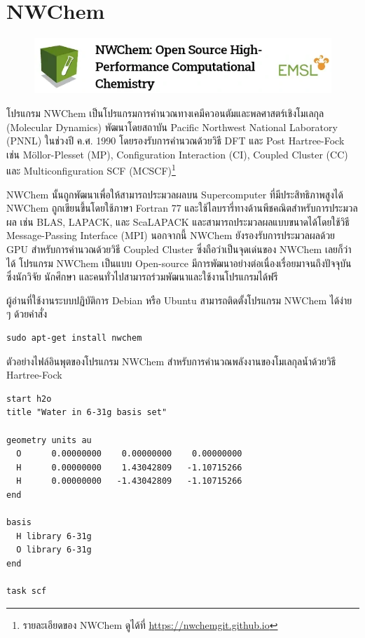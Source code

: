 \section{NWChem}
\label{sec:software_nwchem}

\begin{figure}[H]
    \centering
    \includegraphics[width=0.7\linewidth]{fig/logo_nwchem.png}
    \label{fig:logo_nwchem}
\end{figure}

โปรแกรม NWChem เป็นโปรแกรมการคำนวณทางเคมีควอนตัมและพลศาสตร์เชิงโมเลกุล (Molecular Dynamics)\autocite{apra2020} 
พัฒนาโดยสถาบัน Pacific Northwest National Laboratory (PNNL) ในช่วงปี ค.ศ. 1990 โดยรองรับการคำนวณด้วยวิธี DFT และ Post Hartree-Fock เช่น M\"{o}llor-Plesset (MP), Configuration Interaction (CI), Coupled Cluster (CC) และ Multiconfiguration SCF (MCSCF)\footnote{รายละเอียดของ NWChem ดูได้ที่ \url{https://nwchemgit.github.io}}

NWChem นั้นถูกพัฒนาเพื่อให้สามารถประมวลผลบน Supercomputer ที่มีประสิทธิภาพสูงได้ NWChem ถูกเขียนขึ้นโดยใช้ภาษา Fortran 77 และใช้ไลบรารี่ทางด้านพีชคณิตสำหรับการประมวลผล เช่น BLAS, LAPACK, และ ScaLAPACK และสามารถประมวลผลแบบขนาดได้โดยใช้วิธี Message-Passing Interface (MPI) นอกจากนี้ NWChem ยังรองรับการประมวลผลด้วย GPU สำหรับการคำนวณด้วยวิธี Coupled Cluster ซึ่งถือว่าเป็นจุดเด่นของ NWChem เลยก็ว่าได้ โปรแกรม NWChem เป็นแบบ Open-source มีการพัฒนาอย่างต่อเนื่องเรื่อยมาจนถึงปัจจุบัน ซึ่งนักวิจัย นักศึกษา และคนทั่วไปสามารถร่วมพัฒนาและใช้งานโปรแกรมได้ฟรี

\noindent ผู้อ่านที่ใช้งานระบบปฏิบัติการ Debian หรือ Ubuntu สามารถติดตั้งโปรแกรม NWChem ได้ง่าย ๆ ด้วยคำสั่ง

\begin{lstlisting}[style=MyBash]
sudo apt-get install nwchem
\end{lstlisting}

\vspace{1em}

\noindent ตัวอย่างไฟล์อินพุตของโปรแกรม NWChem สำหรับการคำนวณพลังงานของโมเลกุลน้ำด้วยวิธี Hartree-Fock

\begin{lstlisting}[style=plain]
start h2o 
title "Water in 6-31g basis set" 

geometry units au  
  O      0.00000000    0.00000000    0.00000000  
  H      0.00000000    1.43042809   -1.10715266  
  H      0.00000000   -1.43042809   -1.10715266 
end  

basis  
  H library 6-31g  
  O library 6-31g  
end

task scf
\end{lstlisting}

